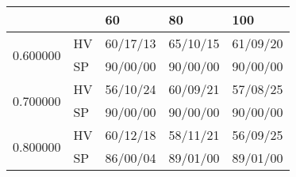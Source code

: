 \begin{tabular}{lllll}
\toprule
 &  & 60 & 80 & 100 \\
\midrule
\multirow[t]{2}{*}{0.600000} & HV & 60/17/13 & 65/10/15 & 61/09/20 \\
 & SP & 90/00/00 & 90/00/00 & 90/00/00 \\
\cline{1-5}
\multirow[t]{2}{*}{0.700000} & HV & 56/10/24 & 60/09/21 & 57/08/25 \\
 & SP & 90/00/00 & 90/00/00 & 90/00/00 \\
\cline{1-5}
\multirow[t]{2}{*}{0.800000} & HV & 60/12/18 & 58/11/21 & 56/09/25 \\
 & SP & 86/00/04 & 89/01/00 & 89/01/00 \\
\cline{1-5}
\bottomrule
\end{tabular}
